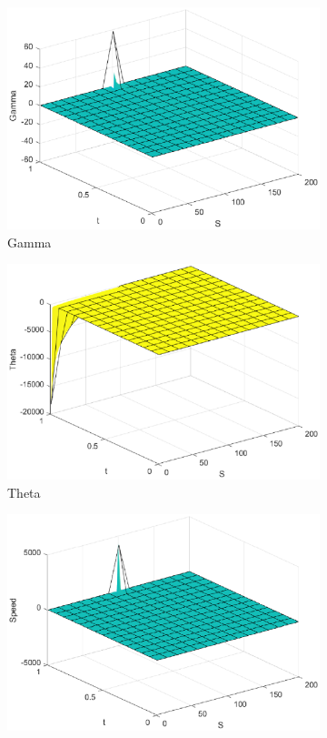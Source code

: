 \begin{figure}[H]
\begin{subfigure}[b]{0.35\linewidth}
        \includegraphics[width=\linewidth]{Imagenes/6_Sols/Binary_Put/Binary_Put_Gamma.eps}
        \caption{Gamma}
    \end{subfigure}
    \begin{subfigure}[b]{0.35\linewidth}
        \includegraphics[width=\linewidth]{Imagenes/6_Sols/Binary_Put/Binary_Put_Theta.eps}
        \caption{Theta}
    \end{subfigure}
    \begin{subfigure}[b]{0.35\linewidth}
        \includegraphics[width=\linewidth]{Imagenes/6_Sols/Binary_Put/Binary_Put_Speed.eps}

\end{subfigure}
\end{figure}
